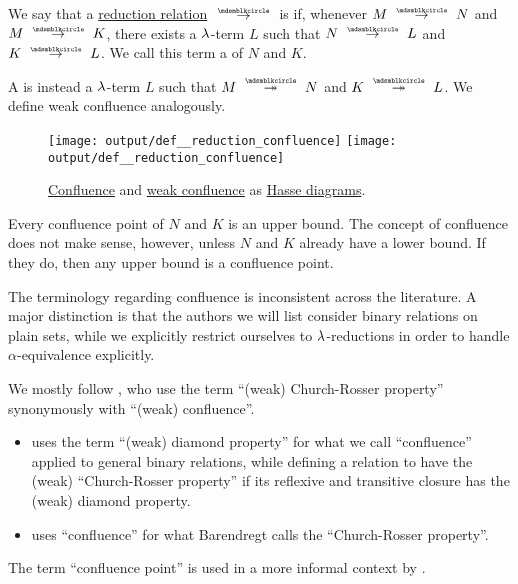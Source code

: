 \begin{definition}\label{def:reduction_confluence}
  We say that a \hyperref[def:lambda_reduction]{reduction relation} \( {\pred} \) is  if, whenever \( M \pred N \) and \( M \pred K \), there exists a \( \mathrm{\lambda} \)-term \( L \) such that \( N \pred L \) and \( K \pred L \). We call this term a   of \( N \) and \( K \).

  A  is instead a \( \mathrm{\lambda} \)-term \( L \) such that \( M \pred* N \) and \( K \pred* L \). We define weak confluence analogously.

  \begin{figure}[!ht]
    \hfill
    \texttt{[image: output/def\_\_reduction\_confluence]}
    \hfill
    \texttt{[image: output/def\_\_reduction\_confluence]}
    \hfill
    \hfill
    \caption{\hyperref[def:reduction_confluence]{Confluence} and \hyperref[def:reduction_confluence]{weak confluence} as \hyperref[def:hasse_diagram]{Hasse diagrams}.}\label{fig:def:relation_confluence}
  \end{figure}
\end{definition}
\begin{comments}
  \item Every confluence point of \( N \) and \( K \) is an upper bound. The concept of confluence does not make sense, however, unless \( N \) and \( K \) already have a lower bound. If they do, then any upper bound is a confluence point.

  \item The terminology regarding confluence is inconsistent across the literature. A major distinction is that the authors we will list consider binary relations on plain sets, while we explicitly restrict ourselves to \( \mathrm{\lambda} \)-reductions in order to handle \( \alpha \)-equivalence explicitly.

  We mostly follow , who use the term \enquote{(weak) Church-Rosser property} synonymously with \enquote{(weak) confluence}.
  \begin{itemize}
    \item {} uses the term \enquote{(weak) diamond property} for what we call \enquote{confluence} applied to general binary relations, while defining a relation to have the (weak) \enquote{Church-Rosser property} if its reflexive and transitive closure has the (weak) diamond property.

    \item {} uses \enquote{confluence} for what Barendregt calls the \enquote{Church-Rosser property}.
  \end{itemize}

  The term \enquote{confluence point} is used in a more informal context by .
\end{comments}

